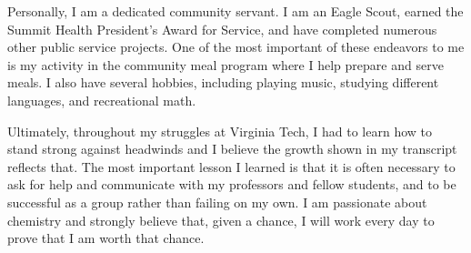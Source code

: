 \documentclass[12pt]{article}
\begin{document}
Personally, I am a dedicated community servant.  I am an Eagle Scout, earned the Summit Health President’s Award for Service, and have completed numerous other public service projects.  One of the most important of these endeavors to me is my activity in the community meal program where I help prepare and serve meals.  I also have several hobbies, including playing music, studying different languages, and recreational math. 

Ultimately, throughout my struggles at Virginia Tech, I had to learn how to stand strong against headwinds and I believe the growth shown in my transcript reflects that.  The most important lesson I learned is that it is often necessary to ask for help and communicate with my professors and fellow students, and to be successful as a group rather than failing on my own.  I am passionate about chemistry and strongly believe that, given a chance, I will work every day to prove that I am worth that chance. 
\end{document}
